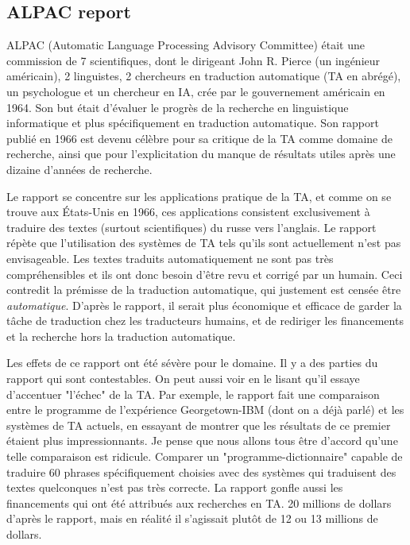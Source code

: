 \documentclass[11pt, a4paper]{report}
\begin{document}
  \subsection*{ALPAC report} 
  ALPAC (Automatic Language Processing Advisory Committee) était une commission de 7 scientifiques, 
  dont le dirigeant John R. Pierce (un ingénieur américain), 2 linguistes, 2 chercheurs en traduction 
  automatique (TA en abrégé), un psychologue et un chercheur en IA, 
  crée par le gouvernement américain en 1964. Son but était d'évaluer le progrès de la 
  recherche en linguistique informatique et plus spécifiquement en traduction automatique. Son rapport 
  publié en 1966 est devenu célèbre pour sa critique de la TA comme domaine de recherche, 
  ainsi que pour l'explicitation du manque de résultats utiles après une dizaine d'années de recherche. 

  Le rapport se concentre sur les applications pratique de la TA, et comme on se trouve aux 
  États-Unis en 1966, ces applications consistent exclusivement à traduire des textes 
  (surtout scientifiques) du russe vers l'anglais. Le rapport répète que l'utilisation des 
  systèmes de TA tels qu'ils sont actuellement n'est pas envisageable. Les textes traduits 
  automatiquement ne sont pas très compréhensibles et ils ont donc besoin d'être revu et 
  corrigé par un humain. Ceci contredit la prémisse de la traduction automatique, qui justement est
  censée être \textit{automatique}. D'après le rapport, il serait plus économique et efficace 
  de garder la tâche de traduction chez les traducteurs humains, et de rediriger les financements 
  et la recherche hors la traduction automatique. 

  Les effets de ce rapport ont été sévère pour le domaine. Il y a des parties du rapport qui sont 
  contestables. On peut aussi voir en le lisant qu'il essaye d'accentuer "l'échec" de la TA. 
  Par exemple, le rapport fait une comparaison entre le programme de l'expérience Georgetown-IBM 
  (dont on a déjà parlé) et les systèmes de TA actuels, en essayant de montrer que les résultats 
  de ce premier étaient plus impressionnants. Je pense que nous allons tous être 
  d'accord qu'une telle comparaison est ridicule. Comparer un "programme-dictionnaire" capable 
  de traduire 60 phrases spécifiquement choisies avec des systèmes qui traduisent des textes 
  quelconques n'est pas très correcte. La rapport gonfle aussi les financements qui ont 
  été attribués aux recherches en TA. 20 millions de dollars d'après le rapport, mais en réalité 
  il s'agissait plutôt de 12 ou 13 millions de dollars. 
  
\end{document}
